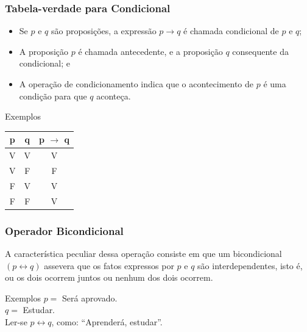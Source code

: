 \documentclass{beamer}
\begin{document}
\begin{frame}
\frametitle{Tabela-verdade para Condicional}

\begin{itemize}
\item Se $p$ e $q$ são proposições, a expressão $p \rightarrow q$ é chamada condicional de $p$ e $q$;
\item A proposição $p$ é chamada antecedente, e a proposição $q$ consequente da condicional; e
\item A operação de condicionamento indica que o acontecimento de $p$ é uma condição para que $q$ aconteça.
\end{itemize} \vfill

\begin{exampleblock}{Exemplos}
\center
\begin{tabular}{|c|c|c|}
	\hline
	\textbf{p} & \textbf{q} & \textbf{p $\rightarrow$ q}\\ \hline
	V & V & V \\ \hline
	V & F & F \\ \hline
	F & V & V \\ \hline
	F & F & V \\ \hline
\end{tabular}
\end{exampleblock}
\end{frame}

\begin{frame}
\frametitle{Operador Bicondicional}

A característica peculiar dessa operação consiste em que um bicondicional $(p \leftrightarrow q)$ assevera que os fatos expressos por $p$ e $q$ são interdependentes,
isto é, ou os dois ocorrem juntos ou nenhum dos dois ocorrem.\vfill

\begin{exampleblock}{Exemplos}
$p =$ Será aprovado.\\
$q =$ Estudar.\\
Ler-se $p \leftrightarrow q$, como: ``Aprenderá,  estudar''.
\end{exampleblock}
\end{frame}
\end{document}
